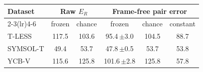 \begin{tabular}{@{}l cc ccc@{}}
\toprule
Dataset & \multicolumn{2}{c}{Raw $E_R$} & \multicolumn{3}{c}{Frame-free pair error} \\
\cmidrule(lr){2-3}\cmidrule(lr){4-6} & frozen & chance & frozen & chance & constant \\
\midrule
T-LESS & 117.5 & 103.6 & 95.4\,{\scriptsize$\pm$3.0} & 104.5 & 88.7 \\
SYMSOL-T & 49.4 & 53.7 & 47.8\,{\scriptsize$\pm$0.5} & 53.7 & 53.8 \\
YCB-V & 115.6 & 125.8 & 101.6\,{\scriptsize$\pm$2.8} & 125.8 & 57.8 \\
\bottomrule
\end{tabular}